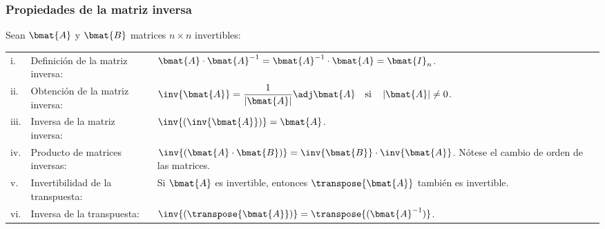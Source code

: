 \documentclass{fmbnotes}
\begin{document}
\subsubsection{Propiedades de la matriz inversa}
Sean \(\bmat{A}\) y \(\bmat{B}\) matrices \(n \times n\) invertibles:
\begin{longtable}{lp{}p{}}
	\rule[1ex]{0pt}{2.5ex}i.&Definición de la matriz inversa: &\( \bmat{A} \cdot \bmat{A}^{-1} = \bmat{A}^{-1} \cdot \bmat{A} = \bmat{I}_n \). \\
	\rule[2ex]{0pt}{2.5ex}ii.&Obtención de la matriz inversa: &\( \inv{\bmat{A}} = \dfrac{1}{\left|\bmat{A}\right|} \adj\bmat{A} \quad\text{si}\quad\left|\bmat{A}\right|\neq0 \). \\
	\rule[1ex]{0pt}{2.5ex}iii.& Inversa de la matriz inversa: &\( \inv{(\inv{\bmat{A}})}=\bmat{A} \). \\
	\rule[1ex]{0pt}{2.5ex}iv.&Producto de matrices inversas: &\( \inv{(\bmat{A} \cdot \bmat{B})}= \inv{\bmat{B}} \cdot \inv{\bmat{A}}\). Nótese el cambio de orden de las matrices. \\
	\rule[1ex]{0pt}{2.5ex}v.&Invertibilidad de la transpuesta: &Si \(\bmat{A}\) es invertible, entonces \(\transpose{\bmat{A}}\) también es invertible. \\
	\rule[1ex]{0pt}{2.5ex}vi.&Inversa de la transpuesta: & \(\inv{(\transpose{\bmat{A}})}=\transpose{(\bmat{A}^{-1})}\). %
\end{longtable}
\end{document}
